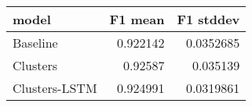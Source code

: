 \begin{tabular}{lrr}
\toprule
 model         &   F1 mean &   F1 stddev \\
\midrule
 Baseline      &  0.922142 &   0.0352685 \\
 Clusters      &  0.92587  &   0.035139  \\
 Clusters-LSTM &  0.924991 &   0.0319861 \\
\bottomrule
\end{tabular}